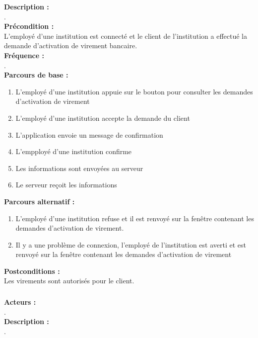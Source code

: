 \documentclass[../rapport.tex]{subfiles}
\begin{document}
\textbf{Description :} \\
. \\

\textbf{Précondition :} \\
L'employé d'une institution est connecté et le client de l'institution a effectué la demande d'activation de virement bancaire. \\

\textbf{Fréquence :} \\
. \\

\textbf{Parcours de base :} \\
\begin{enumerate}
    \item L'employé d'une institution appuie sur le bouton pour consulter les demandes d'activation de virement
    \item L'employé d'une institution accepte la demande du client
    \item L'application envoie un message de confirmation
    \item L'empployé d'une institution confirme
    \item Les informations sont envoyées au serveur
    \item Le serveur reçoit les informations
\end{enumerate}
\bigskip

\textbf{Parcours alternatif :}
\begin{enumerate}
    \item L'employé d'une institution refuse et il est renvoyé sur la fenêtre contenant les demandes d'activation de virement.
    \item Il y a une problème de connexion, l'employé de l'institution est averti et est renvoyé sur la fenêtre contenant les demandes d'activation de virement
\end{enumerate}

\textbf{Postconditions :} \\
Les virements sont autorisés pour le client. \\



\subsubsection{}

\textbf{Acteurs :} \\
. \\

\textbf{Description :} \\
. \\
\end{document}
